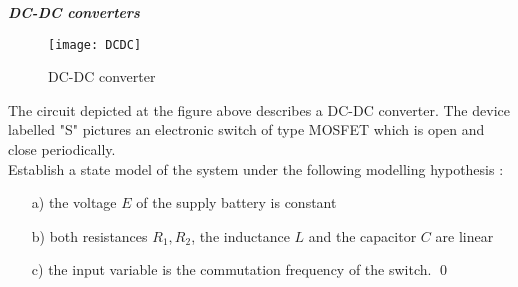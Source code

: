 \begin{exercice}{\bf \em DC-DC converters}

\begin{figure}[htbp]
\begin{center}
\texttt{[image: DCDC]}
\caption{DC-DC converter}
\label{fig:DCDC}
\end{center}
\end{figure}
The circuit depicted at the figure above describes a DC-DC converter.  
The device labelled "S" pictures an electronic switch of type MOSFET 
which is open and close periodically.\\

Establish a state model of the system under the following modelling 
hypothesis :
\begin{itemize}
\item[a)] the voltage $E$ of the supply battery is constant
\item[b)] both resistances $R_1, R_2$, the inductance $L$ and the 
capacitor $C$ are linear
\item[c)] the input variable is the commutation frequency of the switch. \qed
\end{itemize} 
\end{exercice}



